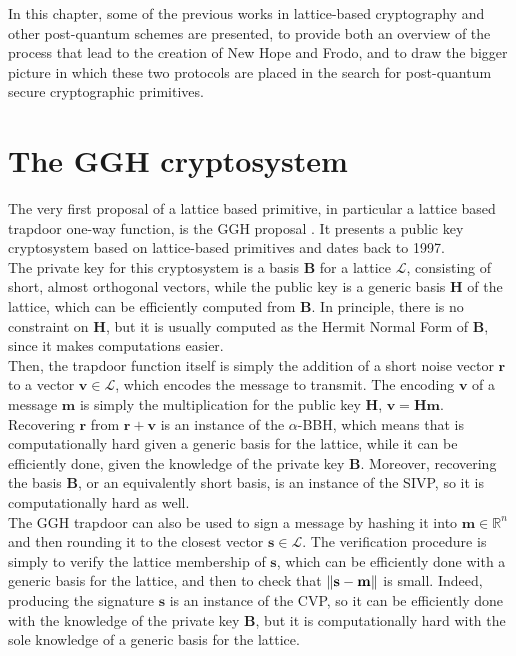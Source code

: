 In this chapter, some of the previous works in lattice-based cryptography and other post-quantum schemes are presented, to provide both an overview of the process that lead to the creation of New Hope and Frodo, and to draw the bigger picture in which these two protocols are placed in the search for post-quantum secure cryptographic primitives.

\section{The GGH cryptosystem}
The very first proposal of a lattice based primitive, in particular a lattice based trapdoor one-way function, is the GGH proposal \cite{GGH}. It presents a public key cryptosystem based on lattice-based primitives and dates back to 1997.\\
The private key for this cryptosystem is a basis $\mathbf{B}$ for a lattice $\mathscr{L}$, consisting of short, almost orthogonal vectors, while the public key is a generic basis $\mathbf{H}$ of the lattice, which can be efficiently computed from $\mathbf{B}$. In principle, there is no constraint on $\mathbf{H}$, but it is usually computed as the Hermit Normal Form of $\mathbf{B}$, since it makes computations easier.\\
Then, the trapdoor function itself is simply the addition of a short noise vector $\mathbf{r}$ to a vector $\mathbf{v}\in\mathscr{L}$, which encodes the message to transmit. The encoding $\mathbf{v}$ of a message $\mathbf{m}$ is simply the multiplication for the public key $\mathbf{H}$,  $\mathbf{v}=\mathbf{H}\mathbf{m}$. Recovering $\mathbf{r}$ from $\mathbf{r}+\mathbf{v}$ is an instance of the $\alpha$-BBH, which means that is computationally hard given a generic basis for the lattice, while it can be efficiently done, given the knowledge of the private key $\mathbf{B}$.
Moreover, recovering the basis $\mathbf{B}$, or an equivalently short basis, is an instance of the SIVP, so it is computationally hard as well.\\
The GGH trapdoor can also be used to sign a message by hashing it into $\mathbf{m}\in\mathbb{R}^n$ and then rounding it to the closest vector $\mathbf{s}\in\mathscr{L}$. The verification procedure is simply to verify the lattice membership of $\mathbf{s}$, which can be efficiently done with a generic basis for the lattice, and then to check that $\left\lVert \mathbf{s}-\mathbf{m} \right\rVert$ is small. Indeed, producing the signature $\mathbf{s}$ is an instance of the CVP, so it can be efficiently done with the knowledge of the private key $\mathbf{B}$, but it is computationally hard with the sole knowledge of a generic basis for the lattice.\\

